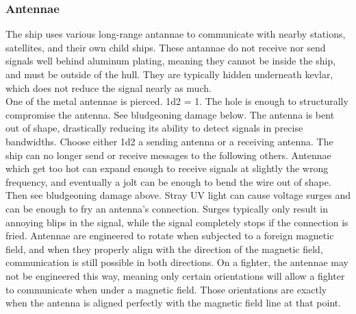 \documentclass[a4paper]{article}
\begin{document}
\hspace{-18pt} \subsubsection{Antennae} \label{outer_antennae} \vspace{-0.2cm}
The ship uses various long-range antannae to communicate with nearby stations, satellites, and their own child ships. These antannae do not receive nor send signals well behind aluminum plating, meaning they cannot be inside the ship, and must be outside of the hull. They are typically hidden underneath kevlar, which does not reduce the signal nearly as much.
\\ \pbhw
{One of the metal antennae is pierced. \newline 1d2 = 1. The hole is enough to structurally compromise the antenna. See bludgeoning damage below.}
{The antenna is bent out of shape, drastically reducing its ability to detect signals in precise bandwidths. Choose either 1d2 a sending antenna or a receiving antenna. The ship can no longer send or receive messages to the following others. \newline {} }
{Antennae which get too hot can expand enough to receive signals at slightly the wrong frequency, and eventually a jolt can be enough to bend the wire out of shape. Then see bludgeoning damage above.}
{Stray UV light can cause voltage surges and can be enough to fry an antenna's connection. Surges typically only result in annoying blips in the signal, while the signal completely stops if the connection is fried. \newline \hspace*{3pt} Antennae are engineered to rotate when subjected to a foreign magnetic field, and when they properly align with the direction of the magnetic field, communication is still possible in both directions. On a fighter, the antennae may not be engineered this way, meaning only certain orientations will allow a fighter to communicate when under a magnetic field. Those orientations are exactly when the antenna is aligned perfectly with the magnetic field line at that point.}
\end{document}
